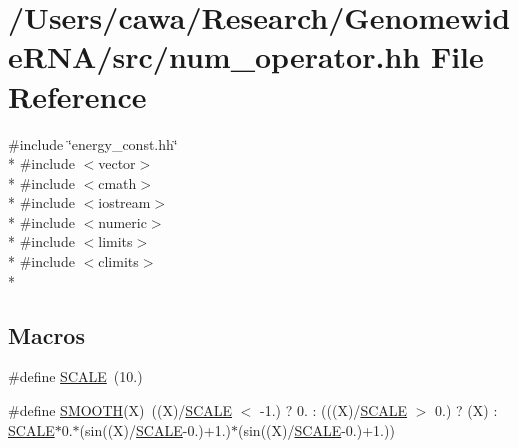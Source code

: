 \hypertarget{num__operator_8hh}{\section{/\+Users/cawa/\+Research/\+Genomewide\+R\+N\+A/src/num\+\_\+operator.hh File Reference}
\label{num__operator_8hh}
}
{\ttfamily \#include \char`\"{}energy\+\_\+const.\+hh\char`\"{}}\\*
{\ttfamily \#include $<$vector$>$}\\*
{\ttfamily \#include $<$cmath$>$}\\*
{\ttfamily \#include $<$iostream$>$}\\*
{\ttfamily \#include $<$numeric$>$}\\*
{\ttfamily \#include $<$limits$>$}\\*
{\ttfamily \#include $<$climits$>$}\\*
\subsection*{Macros}
\begin{DoxyCompactItemize}
\item 
\#define \hyperlink{num__operator_8hh_a0cbea62f1ce2043dd08108e65ed8de1d}{S\+C\+A\+L\+E}~(10.)
\item 
\#define \hyperlink{num__operator_8hh_a0e75be7c3935c7c6d0b1dfba05fe37a6}{S\+M\+O\+O\+T\+H}(X)~((X)/\hyperlink{num__operator_8hh_a0cbea62f1ce2043dd08108e65ed8de1d}{S\+C\+A\+L\+E} $<$ -\/1.) ? 0. \+: (((X)/\hyperlink{num__operator_8hh_a0cbea62f1ce2043dd08108e65ed8de1d}{S\+C\+A\+L\+E} $>$ 0.) ? (X) \+: \hyperlink{num__operator_8hh_a0cbea62f1ce2043dd08108e65ed8de1d}{S\+C\+A\+L\+E}$\ast$0.$\ast$(sin((X)/\hyperlink{num__operator_8hh_a0cbea62f1ce2043dd08108e65ed8de1d}{S\+C\+A\+L\+E}-\/0.)+1.)$\ast$(sin((X)/\hyperlink{num__operator_8hh_a0cbea62f1ce2043dd08108e65ed8de1d}{S\+C\+A\+L\+E}-\/0.)+1.))
\end{DoxyCompactItemize}
